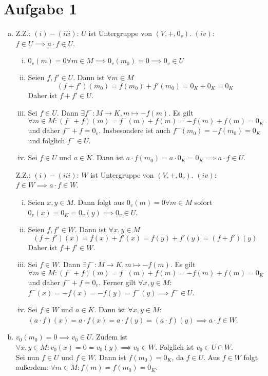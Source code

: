 \documentclass{article}
\begin{document}
	\section*{Aufgabe 1}
	\begin{enumerate}[(a)]
		\item Z.Z.: $(i) - (iii)$: $U$ ist Untergruppe von $(V,+,0_v)$. $(iv)$: $f \in U\implies a\cdot f\in U$.
		\begin{enumerate}[(i)]
			\item $0_v(m) = 0\forall m \in M\implies 0_v(m_0) = 0\implies 0_v \in U$
			\item Seien $f, f'\in U$. Dann ist $\forall m\in M$
			\[(f+f')(m_0) = f(m_0) + f'(m_0) = 0_K+0_K = 0_K\]
			Daher ist $f + f'\in U$.
			\item  Sei $f\in U$. Dann $\exists f^-: M\to K, m\mapsto -f(m)$. 
			Es gilt $\forall m \in M: (f^- + f)(m) = f^-(m) + f(m) = -f(m) + f(m) = 0_K$ und daher $f^- + f = 0_v$. Insbesondere ist auch $f^-(m_0) = -f(m_0) = 0_K$ und folglich $f^- \in U$.
			\item Sei $f\in U$ und $a\in K$. Dann ist $a\cdot f(m_0) = a\cdot 0_K = 0_K \implies a\cdot f \in U$.
		\end{enumerate}
		Z.Z.: $(i) - (iii)$: $W$ ist Untergruppe von $(V,+,0_v)$. $(iv)$: $f \in W\implies a\cdot f\in W$.
		\begin{enumerate}[(i)]
			\item Seien $x,y \in M$. Dann folgt aus $0_v(m) = 0\forall m \in M$ sofort $0_v(x) = 0_K = 0_v(y)\implies 0_v \in U$.
			\item Seien $f, f'\in W$. Dann ist $\forall x,y\in M$
			\[(f+f')(x) = f(x) + f'(x) = f(y) + f'(y) = (f + f')(y)\]
			Daher ist $f + f'\in W$.
			\item  Sei $f\in W$. Dann $\exists f^-: M\to K, m\mapsto -f(m)$.
			Es gilt $\forall m \in M: (f^- + f)(m) = f^-(m) + f(m) = -f(m) + f(m) = 0_K$ und daher $f^- + f = 0_v$.
			Ferner gilt $\forall x,y\in M$: $f^-(x) = -f(x) = -f(y) = f^-(y) \implies f^- \in U$.
			\item Sei $f\in W$ und $a\in K$. Dann ist $\forall x,y \in M$: $(a\cdot f)(x) = a\cdot f(x) = a\cdot f(y) = (a\cdot f)(y) \implies a\cdot f \in W$.
		\end{enumerate}
	\item $v_0(m_0) = 0 \implies v_0 \in U$. Zudem ist $\forall x,y \in M: v_0(x) = 0 = v_0(y)\implies v_0 \in W$. Folglich ist $v_0 \in U\cap W$.\\
	Sei nun $f\in U$ und $f\in W$. Dann ist $f(m_0) = 0_K$, da $f\in U$. Aus $f\in W$ folgt außerdem: $\forall m\in M: f(m) = f(m_0) = 0_K$.

\end{enumerate}
\end{document}
